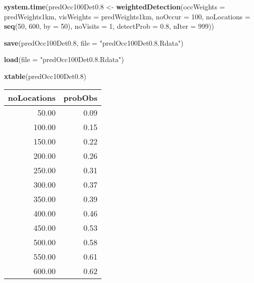 \documentclass[]{article}
\newenvironment{Shaded}{\begin{snugshade}}{\end{snugshade}}
\newcommand{\KeywordTok}[1]{\textcolor[rgb]{0.13,0.29,0.53}{\textbf{#1}}}
\newcommand{\DataTypeTok}[1]{\textcolor[rgb]{0.13,0.29,0.53}{#1}}
\newcommand{\DecValTok}[1]{\textcolor[rgb]{0.00,0.00,0.81}{#1}}
\newcommand{\FloatTok}[1]{\textcolor[rgb]{0.00,0.00,0.81}{#1}}
\newcommand{\StringTok}[1]{\textcolor[rgb]{0.31,0.60,0.02}{#1}}
\newcommand{\NormalTok}[1]{#1}
\begin{document}
\begin{Shaded}
\begin{Highlighting}[]
\KeywordTok{system.time}\NormalTok{(predOcc100Det0.}\DecValTok{8}\NormalTok{ <-}\StringTok{ }\KeywordTok{weightedDetection}\NormalTok{(}\DataTypeTok{occWeights =}\NormalTok{ predWeights1km, }
    \DataTypeTok{visWeights =}\NormalTok{ predWeights1km, }\DataTypeTok{noOccur =} \DecValTok{100}\NormalTok{, }\DataTypeTok{noLocations =} \KeywordTok{seq}\NormalTok{(}\DecValTok{50}\NormalTok{, }\DecValTok{600}\NormalTok{, }\DataTypeTok{by =} \DecValTok{50}\NormalTok{), }
    \DataTypeTok{noVisits =} \DecValTok{1}\NormalTok{, }\DataTypeTok{detectProb =} \FloatTok{0.8}\NormalTok{, }\DataTypeTok{nIter =} \DecValTok{999}\NormalTok{))}

\KeywordTok{save}\NormalTok{(predOcc100Det0.}\DecValTok{8}\NormalTok{, }\DataTypeTok{file =} \StringTok{"predOcc100Det0.8.Rdata"}\NormalTok{)}
\end{Highlighting}
\end{Shaded}

\begin{Shaded}
\begin{Highlighting}[]
\KeywordTok{load}\NormalTok{(}\DataTypeTok{file =} \StringTok{"predOcc100Det0.8.Rdata"}\NormalTok{)}

\KeywordTok{xtable}\NormalTok{(predOcc100Det0.}\DecValTok{8}\NormalTok{)}
\end{Highlighting}
\end{Shaded}

\begin{table}[ht]
\centering
\begin{tabular}{rr}
  \hline
noLocations & probObs \\ 
  \hline
50.00 & 0.09 \\ 
  100.00 & 0.15 \\ 
  150.00 & 0.22 \\ 
  200.00 & 0.26 \\ 
  250.00 & 0.31 \\ 
  300.00 & 0.37 \\ 
  350.00 & 0.39 \\ 
  400.00 & 0.46 \\ 
  450.00 & 0.53 \\ 
  500.00 & 0.58 \\ 
  550.00 & 0.61 \\ 
  600.00 & 0.62 \\ 
   \hline
\end{tabular}
\end{table}
\end{document}
